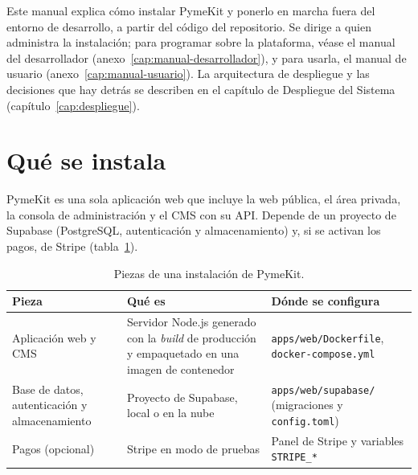 \label{anx:manual-instalacion}

\sloppy


Este manual explica cómo instalar PymeKit y ponerlo en marcha fuera del
entorno de desarrollo, a partir del código del repositorio. Se dirige a quien
administra la instalación; para programar sobre la plataforma, véase el manual
del desarrollador (anexo~\ref{cap:manual-desarrollador}), y para usarla, el
manual de usuario (anexo~\ref{cap:manual-usuario}). La arquitectura de
despliegue y las decisiones que hay detrás se describen en el capítulo de
Despliegue del Sistema (capítulo~\ref{cap:despliegue}).

\section{Qué se instala}
\label{sec:ig-piezas}

PymeKit es una sola aplicación web que incluye la web pública, el área
privada, la consola de administración y el CMS con su API. Depende de un
proyecto de Supabase (PostgreSQL, autenticación y almacenamiento) y, si se
activan los pagos, de Stripe (tabla~\ref{tab:ig-piezas}).

\begin{table}[htbp]
  \centering
  \footnotesize
  \caption{Piezas de una instalación de PymeKit.}
  \label{tab:ig-piezas}
  \begin{tabularx}{\textwidth}{@{}>{\raggedright\arraybackslash}p{3.4cm}X>{\raggedright\arraybackslash}p{4.2cm}@{}}
    \toprule
    \textbf{Pieza} & \textbf{Qué es} & \textbf{Dónde se configura} \\
    \midrule
    Aplicación web y CMS & Servidor Node.js generado con la \textit{build} de producción y empaquetado en una imagen de contenedor & \texttt{apps/web/Dockerfile}, \texttt{docker-compose.yml} \\
    Base de datos, autenticación y almacenamiento & Proyecto de Supabase, local o en la nube & \texttt{apps/web/supabase/} (migraciones y \texttt{config.toml}) \\
    Pagos (opcional) & Stripe en modo de pruebas & Panel de Stripe y variables \texttt{STRIPE\_*} \\
    \bottomrule
  \end{tabularx}
\end{table}

